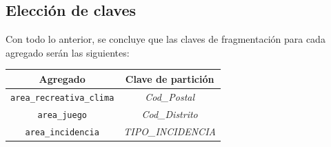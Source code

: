 \documentclass[]{article}
\begin{document}
\subsection{Elección de claves}
\label{subsec:eleccion}

Con todo lo anterior, se concluye que las claves de fragmentación para cada agregado serán las siguientes: 

\begin{center}
\begin{tabular}{@{}cc@{}}
    \toprule
    Agregado & Clave de partición\\
    \midrule
    \texttt{area\_recreativa\_clima} & \textit{Cod\_Postal}\\
    \texttt{area\_juego} & \textit{Cod\_Distrito}\\
    \texttt{area\_incidencia} & \textit{TIPO\_INCIDENCIA}\\
    \bottomrule
\end{tabular}
\end{center}
\end{document}
